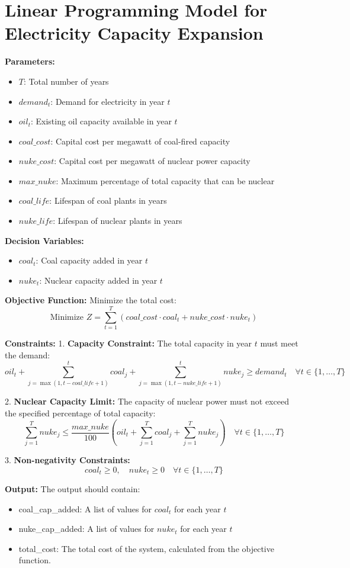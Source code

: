\documentclass{article}
\begin{document}
\section*{Linear Programming Model for Electricity Capacity Expansion}

\textbf{Parameters:}
\begin{itemize}
    \item $T$: Total number of years
    \item $demand_t$: Demand for electricity in year $t$
    \item $oil_t$: Existing oil capacity available in year $t$
    \item $coal\_cost$: Capital cost per megawatt of coal-fired capacity
    \item $nuke\_cost$: Capital cost per megawatt of nuclear power capacity
    \item $max\_nuke$: Maximum percentage of total capacity that can be nuclear
    \item $coal\_life$: Lifespan of coal plants in years
    \item $nuke\_life$: Lifespan of nuclear plants in years
\end{itemize}

\textbf{Decision Variables:}
\begin{itemize}
    \item $coal_t$: Coal capacity added in year $t$
    \item $nuke_t$: Nuclear capacity added in year $t$
\end{itemize}

\textbf{Objective Function:}
Minimize the total cost:
\[
\text{Minimize } Z = \sum_{t=1}^{T} (coal\_cost \cdot coal_t + nuke\_cost \cdot nuke_t)
\]

\textbf{Constraints:}
1. \textbf{Capacity Constraint:}
   The total capacity in year $t$ must meet the demand:
   \[
   oil_t + \sum_{j=\max(1,t-coal\_life+1)}^{t} coal_j + \sum_{j=\max(1,t-nuke\_life+1)}^{t} nuke_j \geq demand_t \quad \forall t \in \{1, \ldots, T\}
   \]

2. \textbf{Nuclear Capacity Limit:}
   The capacity of nuclear power must not exceed the specified percentage of total capacity:
   \[
   \sum_{j=1}^{T} nuke_j \leq \frac{max\_nuke}{100} \left( oil_t + \sum_{j=1}^{T} coal_j + \sum_{j=1}^{T} nuke_j \right) \quad \forall t \in \{1, \ldots, T\}
   \]

3. \textbf{Non-negativity Constraints:}
   \[
   coal_t \geq 0, \quad nuke_t \geq 0 \quad \forall t \in \{1, \ldots, T\}
   \]

\textbf{Output:}
The output should contain:
\begin{itemize}
    \item coal\_cap\_added: A list of values for $coal_t$ for each year $t$
    \item nuke\_cap\_added: A list of values for $nuke_t$ for each year $t$
    \item total\_cost: The total cost of the system, calculated from the objective function.
\end{itemize}
\end{document}
